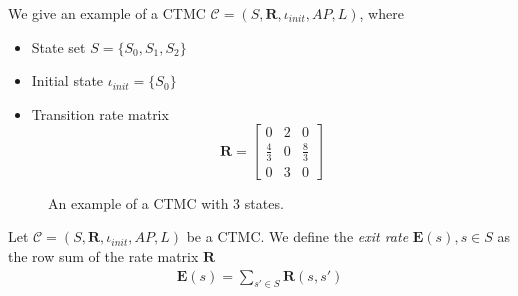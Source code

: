 \begin{example}[CTMC]
      We give an example of a CTMC $\mathcal{C}=(S,\mathbf{R}, \iota_{init}, AP, L)$, where
      \begin{itemize}
            \item State set $S=\{S_0, S_1, S_2\}$
            \item Initial state $\iota_{init} = \{S_0\}$
            \item Transition rate matrix
                  $$
                        \mathbf{R} = \begin{bmatrix}
                              0           & 2 & 0           \\
                              \frac{4}{3} & 0 & \frac{8}{3} \\
                              0           & 3 & 0
                        \end{bmatrix}
                  $$
      \end{itemize}
      \begin{figure}[H]
            \centering
            \label{fig:ctmc}
            \caption{An example of a CTMC with 3 states.}
      \end{figure}
\end{example}

\begin{definition}
      \rm
      Let $\mathcal{C} = (S,\mathbf{R}, \iota_{init}, AP, L)$ be a CTMC. We define the \textit{exit
            rate} $\mathbf{E}(s), s\in S$ as the row sum of the rate matrix $\mathbf{R}$
      \begin{align*}
            \mathbf{E}(s) = \sum_{s'\in S} \mathbf{R}(s, s')
      \end{align*}
\end{definition}

